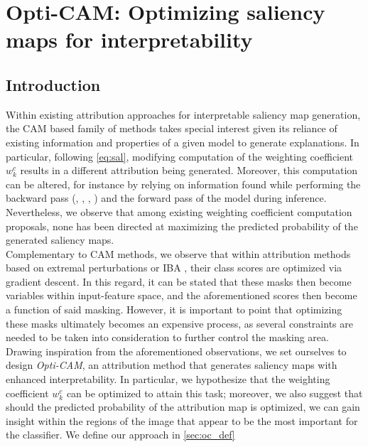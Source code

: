 \chapter{Opti-CAM: Optimizing saliency maps for interpretability}
\chaptertoc{}
\label{ch:opticam}
\section{Introduction}
\label{sec:oc_intro}
\noindent Within existing attribution approaches for interpretable saliency map generation, the CAM  
\autocite{zhou2016learning} based family of methods takes special interest given its reliance of
existing  information and properties of a given model to generate explanations. In particular, 
following \autoref{eq:sal}, modifying computation of the weighting coefficient 
$w_k^c$ results in a different attribution being generated. Moreover, this computation can be 
altered, for instance by relying on information found while performing the backward pass 
(\cite{selvaraju2017grad}, \cite{chattopadhay2018grad}, \cite{axiombased}, 
\cite{smilkov2017smoothgrad}) and the forward pass \autocite{wang2020score} of the model during 
inference. Nevertheless, we observe that among existing weighting coefficient computation 
proposals, none has been directed at maximizing the predicted probability of the generated 
 saliency maps.\\

\noindent Complementary to CAM methods, we observe that within attribution methods based on 
extremal perturbations \autocite{fong2019understanding} or IBA \autocite{schulz2020restricting}, 
their class scores are optimized via gradient descent. In this regard, it can 
be stated that these masks then become variables within input-feature space, and the aforementioned 
scores then become a function of said masking. However, it is important to point that optimizing 
these masks ultimately becomes an expensive process, as several constraints are needed 
to be taken into consideration to further control the masking area.\\

\noindent Drawing inspiration from the aforementioned observations, we set ourselves to design 
\emph{Opti-CAM}, an attribution method that generates saliency maps with enhanced interpretability. 
In particular, we hypothesize that the weighting coefficient $w_k^c$ can be optimized to attain 
this task; moreover, we also suggest that should the predicted probability of the attribution map 
is optimized, we can gain insight within the regions of the image that appear to be the most 
important for the classifier. We define our approach in \autoref{sec:oc_def}\\

